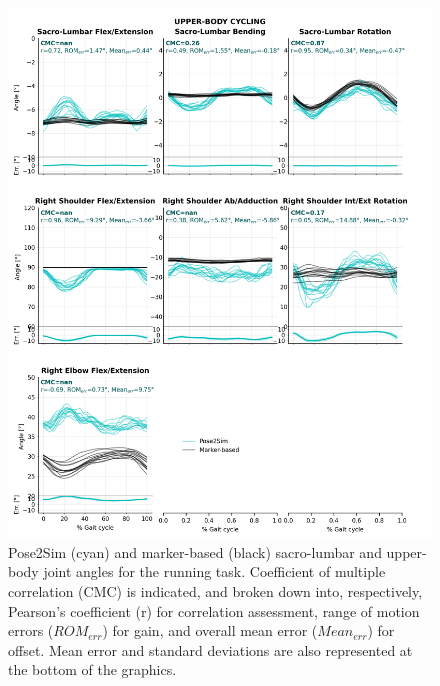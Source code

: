 \begin{figure}[!ht]
	\centering
	\def\svgwidth{1\columnwidth}
	\fontsize{10pt}{10pt}\selectfont
	\includegraphics[height=\dimexpr\textheight-119pt]{"../Annexes/Figures/Fig_QTMBikeUp.png"}
	\caption{Pose2Sim (cyan) and marker-based (black) sacro-lumbar and upper-body joint angles for the running task. Coefficient of multiple correlation (CMC) is indicated, and broken down into, respectively, Pearson’s coefficient (r) for correlation assessment, range of motion errors (\(ROM_{err}\)) for gain, and overall mean error (\(Mean_{err}\)) for offset. Mean error and standard deviations are also represented at the bottom of the graphics.}
	\label{fig_qtmrunup}
\end{figure}

